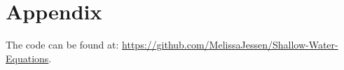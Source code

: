 \section{Appendix}
The code can be found at: \url{https://github.com/MelissaJessen/Shallow-Water-Equations}.

